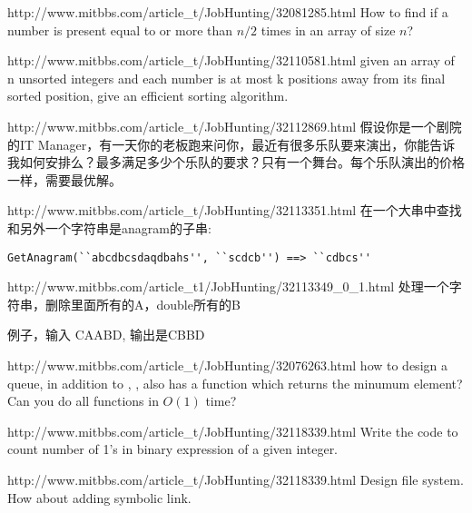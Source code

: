 \documentclass[a4paper]{article}
\newcommand{\ilcode}[1]{
	\framebox[\width]{\texttt{#1}}
}
\begin{document}
\begin{CJK}{UTF8}{gbsn}
\begin{enumerate}
\begin{Q}[Microsoft]{http://www.mitbbs.com/article_t/JobHunting/32081285.html}
How to find if a number is present equal to or more than $n / 2$ times in an array of size $n$? 
\end{Q}

\begin{Q}{http://www.mitbbs.com/article_t/JobHunting/32110581.html}
given an array of n unsorted integers and each number is at most k positions away from its final sorted position, give an efficient sorting algorithm.
\end{Q}

\begin{Q}[Amazon]{http://www.mitbbs.com/article_t/JobHunting/32112869.html}
假设你是一个剧院的IT Manager，有一天你的老板跑来问你，最近有很多乐队要来演出，你能告诉我如何安排么？最多满足多少个乐队的要求？只有一个舞台。每个乐队演出的价格一样，需要最优解。
\end{Q}

\begin{Q}{http://www.mitbbs.com/article_t/JobHunting/32113351.html}
在一个大串中查找和另外一个字符串是anagram的子串:
\begin{lstlisting}
GetAnagram(``abcdbcsdaqdbahs'', ``scdcb'') ==> ``cdbcs''
\end{lstlisting}
\end{Q}

\begin{Q}[Google]{http://www.mitbbs.com/article_t1/JobHunting/32113349_0_1.html}
处理一个字符串，删除里面所有的A，double所有的B

例子，输入 CAABD, 输出是CBBD
\end{Q}

\begin{Q}[Google]{http://www.mitbbs.com/article_t/JobHunting/32076263.html}
how to design a queue, in addition to \ilcode{insert()}, \ilcode{delete()}, also has a function \ilcode{min()} which returns the minumum element? Can you do all functions in $O(1)$ time?
\end{Q}

\begin{Q}[Amazon]{http://www.mitbbs.com/article_t/JobHunting/32118339.html}
Write the code to count number of 1's in binary expression of a given integer.
\end{Q}

\begin{Q}[Amazon]{http://www.mitbbs.com/article_t/JobHunting/32118339.html}
Design file system. How about adding symbolic link.
\end{Q}


\end{enumerate}
\end{CJK}
\end{document}
